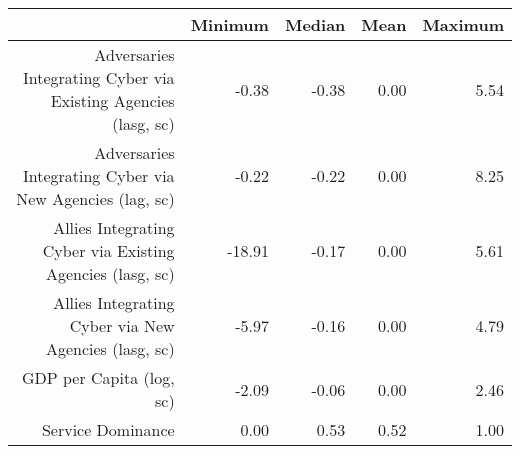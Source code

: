 \begin{table}[ht]
\centering
\begin{tabular}{rrrrr}
  \hline
 & Minimum & Median & Mean & Maximum \\ 
  \hline
Adversaries Integrating Cyber 
 via Existing Agencies (lasg, sc) & -0.38 & -0.38 & 0.00 & 5.54 \\ 
  Adversaries Integrating Cyber 
 via New Agencies (lag, sc) & -0.22 & -0.22 & 0.00 & 8.25 \\ 
  Allies Integrating Cyber 
 via Existing Agencies (lasg, sc) & -18.91 & -0.17 & 0.00 & 5.61 \\ 
  Allies Integrating Cyber 
 via New Agencies (lasg, sc) & -5.97 & -0.16 & 0.00 & 4.79 \\ 
  GDP per Capita (log, sc) & -2.09 & -0.06 & 0.00 & 2.46 \\ 
  Service Dominance & 0.00 & 0.53 & 0.52 & 1.00 \\ 
   \hline
\end{tabular}
\end{table}
